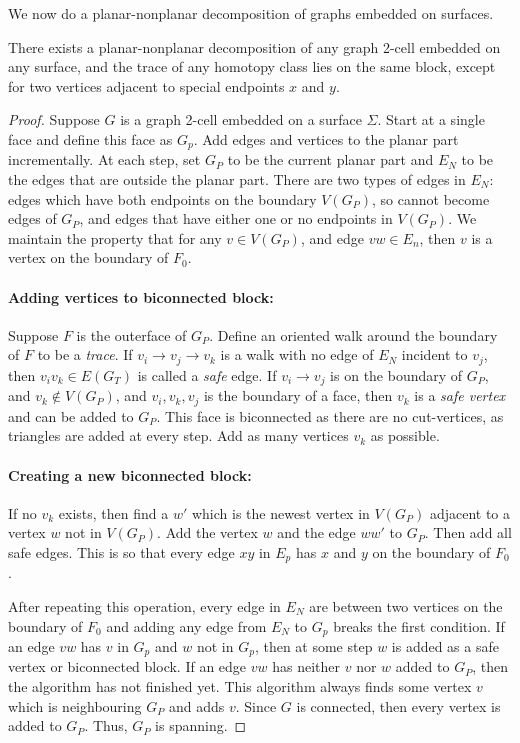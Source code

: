 We now do a planar-nonplanar decomposition of graphs embedded on surfaces.
\begin{claim}\label{claim:planar_nonplanar_decomp}
	There exists a planar-nonplanar decomposition of any graph 2-cell embedded on any surface, and the trace of any homotopy class lies on the same block, except for two vertices adjacent to special endpoints $x$ and $y$. 
\end{claim}
\begin{proof}
	Suppose \(G\) is a graph 2-cell embedded on a surface \(\Sigma\). Start at a single face and define this face as $G_p$. Add edges and vertices to the planar part incrementally. At each step, set \(G_P\) to be the current planar part and \(E_N\) to be the edges that are outside the planar part. There are two types of edges in \(E_N\): edges which have both endpoints on the boundary \(V(G_P)\), so cannot become edges of \(G_P\), and edges that have either one or no endpoints in \(V(G_P)\). We maintain the property that for any \(v \in V(G_P)\), and edge \(vw \in E_n\), then \(v\) is a vertex on the boundary of \(F_0\).
	\paragraph{Adding vertices to biconnected block:}
	Suppose $F$ is the outerface of \(G_P\). Define an oriented walk around the boundary of $F$ to be a \textit{trace}. If \(v_i \rightarrow v_j \rightarrow v_k\) is a walk with no edge of \(E_N\) incident to \(v_j\), then \(v_i v_k \in E(G_T)\) is called a \textit{safe} edge. If \(v_i \rightarrow v_j\) is on the boundary of \(G_P\), and \(v_k \notin V(G_P)\), and \(v_i,v_k,v_j\) is the boundary of a face, then \(v_k\) is a \textit{safe vertex} and can be added to \(G_P\). This face is biconnected as there are no cut-vertices, as triangles are added at every step. Add as many vertices $v_k$ as possible. 

	\paragraph{Creating a new biconnected block:}
	If no \(v_k\) exists, then find a \(w'\) which is the newest vertex in \(V(G_P)\) adjacent to a vertex \(w\) not in \(V(G_P)\). Add the vertex \(w\) and the edge \(w w'\) to \(G_P\). Then add all safe edges. This is so that every edge $xy$ in \(E_p\) has $x$ and $y$ on the boundary of $F_0$. 
	
	After repeating this operation, every edge in \(E_N\) are between two vertices on the boundary of $F_0$ and adding any edge from $E_N$ to $G_p$ breaks the first condition. If an edge \(vw\) has \(v\) in $G_p$ and $w$ not in $G_p$, then at some step \(w\) is added as a safe vertex or biconnected block. If an edge \(vw\) has neither \(v\) nor \(w\) added to \(G_P\), then the algorithm has not finished yet. This algorithm always finds some vertex $v$ which is neighbouring $G_P$ and adds $v$. Since $G$ is connected, then every vertex is added to $G_P$. Thus, $G_P$ is spanning.
	

\end{proof}
